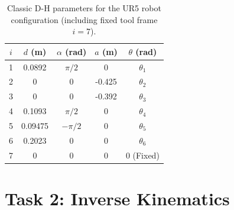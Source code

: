 \documentclass{article}
\begin{document}
\begin{table}[h!]
    \centering
    \begin{tabular}{ccccc}
    \toprule
    $i$ & $d$ (m) & $\alpha$ (rad) & $a$ (m) & $\theta$ (rad) \\
    \midrule
    1 & 0.0892  & $\pi/2$  & 0      & $\theta_1$ \\
    2 & 0       & 0        & -0.425 & $\theta_2$ \\
    3 & 0       & 0        & -0.392 & $\theta_3$ \\
    4 & 0.1093  & $\pi/2$  & 0      & $\theta_4$ \\
    5 & 0.09475 & $-\pi/2$ & 0      & $\theta_5$ \\
    6 & 0.2023  & 0        & 0      & $\theta_6$ \\
    7 & 0       & 0        & 0      & 0 (Fixed) \\
    \bottomrule
    \end{tabular}
    \caption{Classic D-H parameters for the UR5 robot configuration (including fixed tool frame $i=7$).}
\end{table}

\section{Task 2: Inverse Kinematics}
\end{document}
